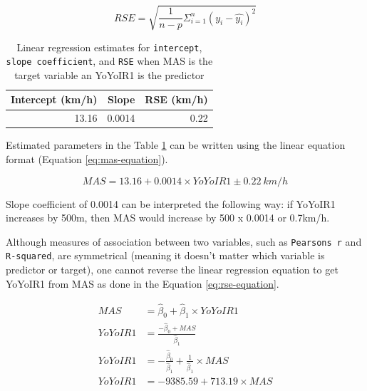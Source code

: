 \documentclass[
]{book}
\begin{document}
\begin{equation}
  RSE = \sqrt{\frac{1}{n-p}\Sigma_{i=1}^{n}(y_i -\hat{y_i})^2}
  \label{eq:rse-equation}
\end{equation}



\begin{table}

\caption{\label{tab:linear-reg-estimates}Linear regression estimates for \texttt{intercept}, \texttt{slope\ coefficient}, and \texttt{RSE} when MAS is the target variable an YoYoIR1 is the predictor}
\centering
\begin{tabular}[t]{rrr}
\toprule
Intercept (km/h) & Slope & RSE (km/h)\\
\midrule
13.16 & 0.0014 & 0.22\\
\bottomrule
\end{tabular}
\end{table}

Estimated parameters in the Table \ref{tab:linear-reg-estimates} can be written using the linear equation format (Equation \eqref{eq:mas-equation}).

\begin{equation}
  MAS = 13.16 + 0.0014 \times YoYoIR1 \pm 0.22 \: km/h
  \label{eq:mas-equation}
\end{equation}

Slope coefficient of 0.0014 can be interpreted the following way: if YoYoIR1 increases by 500m, then MAS would increase by 500 x 0.0014 or 0.7km/h.

Although measures of association between two variables, such as \texttt{Pearson\textquotesingle{}s\ r} and \texttt{R-squared}, are symmetrical (meaning it doesn't matter which variable is predictor or target), one cannot reverse the linear regression equation to get YoYoIR1 from MAS as done in the Equation \eqref{eq:rse-equation}.

\begin{equation}
  \begin{split}
    MAS &= \hat{\beta}_0 + \hat{\beta}_1 \times YoYoIR1 \\
    YoYoIR1 &= \frac{-\hat{\beta}_0 + MAS}{\hat{\beta}_1} \\
    YoYoIR1 &= -\frac{\hat{\beta}_0}{\hat{\beta}_1} + \frac{1}{\hat{\beta}_1}\times MAS \\
    YoYoIR1 &= -9385.59 + 713.19 \times MAS
  \end{split}
  \label{eq:reverse-linear-equation}
\end{equation}
\end{document}
